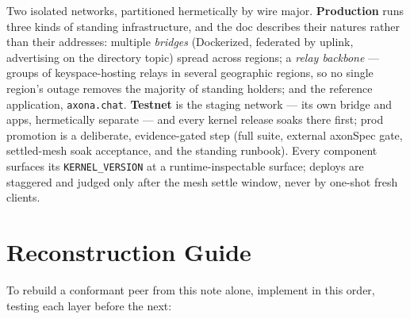 \documentclass[nobib]{tufte-handout}
\begin{document}
Two isolated networks, partitioned hermetically by wire major.
\textbf{Production} runs three kinds of standing infrastructure, and
the doc describes their natures rather than their addresses: multiple
\emph{bridges} (Dockerized, federated by uplink, advertising on the
directory topic) spread across regions; a \emph{relay backbone} ---
groups of keyspace-hosting relays in several geographic regions, so no
single region's outage removes the majority of standing holders; and
the reference application, \texttt{axona.chat}. \textbf{Testnet} is
the staging network --- its own bridge and apps, hermetically separate
--- and every kernel release soaks there first; prod promotion is a
deliberate, evidence-gated step (full suite, external axonSpec gate,
settled-mesh soak acceptance, and the standing runbook). Every component surfaces its
\texttt{KERNEL\_VERSION} at a runtime-inspectable surface; deploys are
staggered and judged only after the mesh settle window, never by
one-shot fresh clients.

\section{Reconstruction Guide}\label{sec:reconstruction}

To rebuild a conformant peer from this note alone, implement in this
order, testing each layer before the next:
\end{document}
